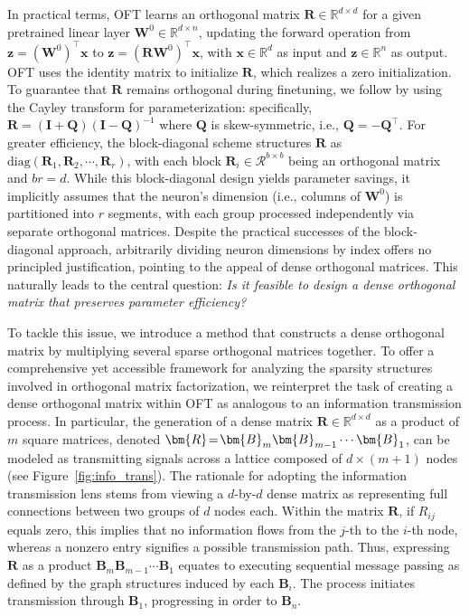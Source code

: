 In practical terms, OFT learns an orthogonal matrix $\bm{R}\in\mathbb{R}^{d\times d}$ for a given pretrained linear layer $\bm{W}^0\in\mathbb{R}^{d\times n}$, updating the forward operation from $\bm{z}=(\bm{W}^0)^\top\bm{x}$ to $\bm{z}=(\bm{R}\bm{W}^0)^\top\bm{x}$, with $\bm{x}\in\mathbb{R}^{d}$ as input and $\bm{z}\in\mathbb{R}^{n}$ as output. OFT uses the identity matrix to initialize $\bm{R}$, which realizes a zero initialization. To guarantee that $\bm{R}$ remains orthogonal during finetuning, we follow \cite{qiu2023controlling,liu2021orthogonal} by using the Cayley transform for parameterization: specifically, $\bm{R}=(\bm{I}+\bm{Q})(\bm{I}-\bm{Q})^{-1}$ where $\bm{Q}$ is skew-symmetric, i.e., $\bm{Q}=-\bm{Q}^\top$. For greater efficiency, the block-diagonal scheme structures $\bm{R}$ as $\text{diag}(\bm{R}_1,\bm{R}_2,\cdots,\bm{R}_r)$, with each block $\bm{R}_i\in\mathcal{R}^{b\times b}$ being an orthogonal matrix and $br=d$. While this block-diagonal design yields parameter savings, it implicitly assumes that the neuron's dimension (i.e., columns of $\bm{W}^0$) is partitioned into $r$ segments, with each group processed independently via separate orthogonal matrices. Despite the practical successes of the block-diagonal approach, arbitrarily dividing neuron dimensions by index offers no principled justification, pointing to the appeal of dense orthogonal matrices. This naturally leads to the central question: \emph{Is it feasible to design a dense orthogonal matrix that preserves parameter efficiency?}

To tackle this issue, we introduce a method that constructs a dense orthogonal matrix by multiplying several sparse orthogonal matrices together. To offer a comprehensive yet accessible framework for analyzing the sparsity structures involved in orthogonal matrix factorization, we reinterpret the task of creating a dense orthogonal matrix within OFT as analogous to an information transmission process. In particular, the generation of a dense matrix $\bm{R}\in\mathbb{R}^{d\times d}$ as a product of $m$ square matrices, denoted $\thickmuskip=2mu \medmuskip=2mu \bm{R}=\bm{B}_m\bm{B}_{m-1}\cdots\bm{B}_1$, can be modeled as transmitting signals across a lattice composed of $d\times (m+1)$ nodes (see Figure~\ref{fig:info_trans}). The rationale for adopting the information transmission lens stems from viewing a $d$-by-$d$ dense matrix as representing full connections between two groups of $d$ nodes each. Within the matrix $\bm{R}$, if $R_{ij}$ equals zero, this implies that no information flows from the $j$-th to the $i$-th node, whereas a nonzero entry signifies a possible transmission path. Thus, expressing $\bm{R}$ as a product $\bm{B}_m\bm{B}_{m-1}\cdots\bm{B}_1$ equates to executing sequential message passing as defined by the graph structures induced by each $\bm{B}_i$. The process initiates transmission through $\bm{B}_1$, progressing in order to $\bm{B}_n$. 

